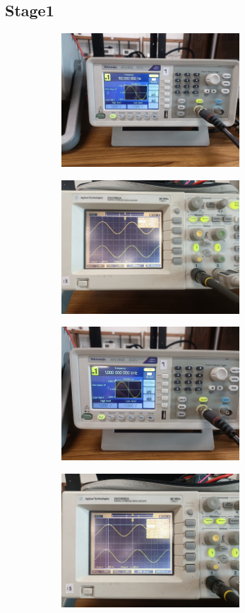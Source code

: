 \documentclass[a4paper,12pt]{article}
\begin{document}
\subsection*{Stage1}
\begin{figure}[H]
    \centering
    \begin{subfigure}{0.5\textwidth}
        \centering
        \includegraphics[height=5cm]{figs/Stage1/100/para.jpeg}
    \end{subfigure}%
    \begin{subfigure}{0.5\textwidth}
        \centering
        \includegraphics[height=5cm]{figs/Stage1/100/plot.jpeg}
    \end{subfigure}
\end{figure}
\begin{figure}[H]
    \centering
    \begin{subfigure}{0.5\textwidth}
        \centering
        \includegraphics[height=5cm]{figs/Stage1/1000/para.jpeg}
    \end{subfigure}%
    \begin{subfigure}{0.5\textwidth}
        \centering
        \includegraphics[height=5cm]{figs/Stage1/1000/plot.jpeg}
    \end{subfigure}
\end{figure}
\end{document}
